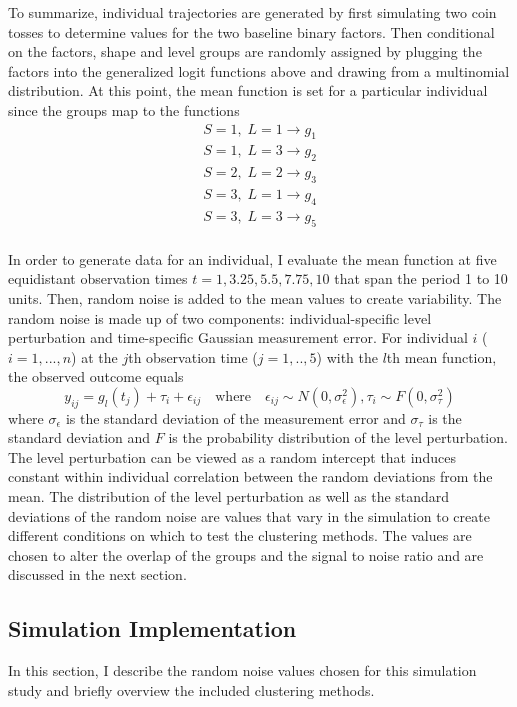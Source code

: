 \documentclass[12pt]{article}
\begin{document}
To summarize, individual trajectories are generated by first simulating two coin tosses to determine values for the two baseline binary factors. Then conditional on the factors, shape and level groups are randomly assigned by plugging the factors into the generalized logit functions above and drawing from a multinomial distribution. At this point, the mean function is set for a particular individual since the groups map to the functions
\begin{align*}
S = 1,\; L=1 \rightarrow g_{1}\\
S = 1,\; L=3 \rightarrow g_{2}\\
S = 2,\; L=2 \rightarrow g_{3}\\
S = 3,\; L=1 \rightarrow g_{4}\\
S = 3,\; L=3 \rightarrow g_{5}\\
\end{align*}

In order to generate data for an individual, I evaluate the mean function at five equidistant observation times $t=1,3.25,5.5,7.75,10$ that span the period 1 to 10 units. Then,  random noise is added to the mean values to create variability. The random noise is made up of two components: individual-specific level perturbation and time-specific Gaussian measurement error. For individual $i$ ($i=1,...,n$) at the $j$th observation time ($j=1,..,5$) with the $l$th mean function, the observed outcome equals
$$y_{ij} = g_{l}(t_{j})+\tau_{i}+\epsilon_{ij}\quad\text{where}\quad \epsilon_{ij}\sim N(0,\sigma_{\epsilon}^{2}), \tau_{i}\sim F(0,\sigma_{\tau}^{2})$$
where $\sigma_{\epsilon}$  is the standard deviation of the measurement error and $\sigma_{\tau}$ is the standard deviation and $F$ is the probability distribution of the level perturbation.\\
 
The level perturbation can be viewed as a random intercept that induces constant within individual correlation between the random deviations from the mean. The distribution of the level perturbation as well as the standard deviations of the random noise are values that vary in the simulation to create different conditions on which to test the clustering methods. The values are chosen to alter the overlap of the groups and the signal to noise ratio and are discussed in the next section.
\subsection{Simulation Implementation}
In this section, I describe the random noise values chosen for this simulation study and briefly overview the included clustering methods. 
\end{document}
